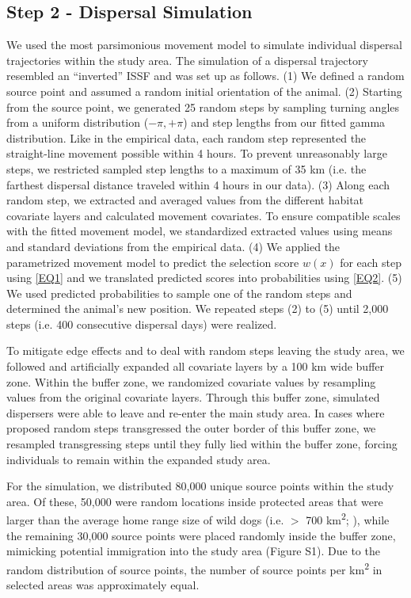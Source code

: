 \documentclass[abstract=on,10pt,a4paper,bibliography=totocnumbered]{article}
\begin{document}
\subsection{Step 2 - Dispersal Simulation}
We used the most parsimonious movement model to simulate individual dispersal
trajectories within the study area. The simulation of a dispersal trajectory
resembled an ``inverted'' ISSF and was set up as follows. (1) We defined a
random source point and assumed a random initial orientation of the animal. (2)
Starting from the source point, we generated 25 random steps by sampling turning
angles from a uniform distribution (\(-\pi, +\pi\)) and step lengths from our
fitted gamma distribution. Like in the empirical data, each random step
represented the straight-line movement possible within 4 hours. To prevent
unreasonably large steps, we restricted sampled step lengths to a maximum of 35
km (i.e. the farthest dispersal distance traveled within 4 hours in our data).
(3) Along each random step, we extracted and averaged values from the different
habitat covariate layers and calculated movement covariates. To ensure
compatible scales with the fitted movement model, we standardized extracted
values using means and standard deviations from the empirical data. (4) We
applied the parametrized movement model to predict the selection score \(w(x)\)
for each step using \ref{EQ1} and we translated predicted scores into
probabilities using \ref{EQ2}. (5) We used predicted probabilities to sample one
of the random steps and determined the animal's new position. We repeated steps
(2) to (5) until 2,000 steps (i.e. 400 consecutive dispersal days) were
realized.

To mitigate edge effects and to deal with random steps leaving the study area,
we followed \cite{Koen.2010} and artificially expanded all covariate layers by
a 100 km wide buffer zone. Within the buffer zone, we randomized covariate
values by resampling values from the original covariate layers. Through this
buffer zone, simulated dispersers were able to leave and re-enter the main study
area. In cases where proposed random steps transgressed the outer border of this
buffer zone, we resampled transgressing steps until they fully lied within the
buffer zone, forcing individuals to remain within the expanded study area.

For the simulation, we distributed 80,000 unique source points within the study
area. Of these, 50,000 were random locations inside protected areas that were
larger than the average home range size of wild dogs (i.e. \(>\) 700
km\textsuperscript{2}; \citealp{Pomilia.2015}), while the remaining 30,000
source points were placed randomly inside the buffer zone, mimicking potential
immigration into the study area (Figure S1). Due to the random distribution of
source points, the number of source points per km\textsuperscript{2} in selected
areas was approximately equal.
\end{document}
